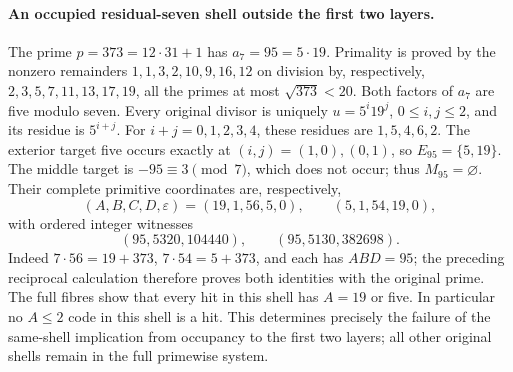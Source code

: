 \paragraph{An occupied residual-seven shell outside the first two layers.}
The prime \(p=373=12\cdot31+1\) has
\(a_7=95=5\cdot19\). Primality is proved by the nonzero remainders
\(1,1,3,2,10,9,16,12\) on division by, respectively,
\(2,3,5,7,11,13,17,19\), all the primes at most
\(\sqrt{373}<20\). Both factors of \(a_7\) are five modulo seven.
Every original divisor is uniquely \(u=5^i19^j\),
\(0\le i,j\le2\), and its residue is \(5^{i+j}\).
For \(i+j=0,1,2,3,4\), these residues are
\(1,5,4,6,2\). The exterior target five occurs exactly at
\((i,j)=(1,0),(0,1)\), so \(E_{95}=\{5,19\}\).
The middle target is \(-95\equiv3\pmod7\), which does not occur;
thus \(M_{95}=\varnothing\).
Their complete primitive coordinates are, respectively,
\[
 (A,B,C,D,\varepsilon)=(19,1,56,5,0),\qquad
 (5,1,54,19,0),
\]
with ordered integer witnesses
\[
 (95,5320,104440),\qquad(95,5130,382698).
\]
Indeed \(7\cdot56=19+373\), \(7\cdot54=5+373\),
and each has \(ABD=95\); the preceding reciprocal calculation
therefore proves both identities with the original prime.
The full fibres show that every hit in this shell has \(A=19\)
or five. In particular no \(A\le2\) code in this shell is a hit.
This determines precisely the failure of the same-shell implication
from occupancy to the first two layers; all other original shells
remain in the full primewise system.
